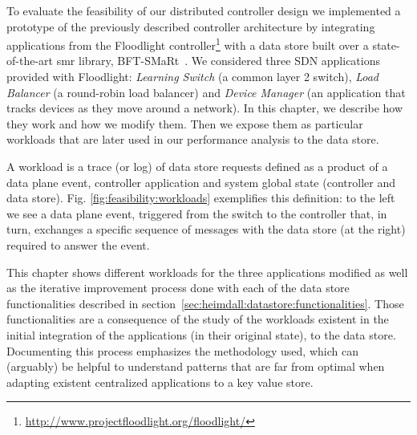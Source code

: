\label{sec:feasibility:apps}
\glsresetall


To evaluate the feasibility of our distributed controller design we implemented a prototype of the previously described controller architecture by integrating applications from the Floodlight controller\footnote{\url{http://www.projectfloodlight.org/floodlight/}} with a data store built over a state-of-the-art \gls{smr} library, BFT-SMaRt~\cite{smart-tr}.
We considered three SDN applications provided with Floodlight: \emph{Learning Switch}  (a common layer 2 switch), \emph{Load   Balancer} (a round-robin load balancer) and \emph{Device Manager} (an application that tracks devices as they move around a network).
In this chapter, we describe how they work and how we modify them.  Then we expose them as particular workloads that are later used in our performance analysis to the data store. 



A workload is a trace (or log) of data store requests  defined as a product of a data plane event, controller application and system global state (controller and data store).
Fig. \ref{fig:feasibility:workloads} exemplifies this definition: to the left we see a data plane event, triggered from the switch to the controller that, in turn, exchanges a specific sequence of messages with the data store (at the right) required to answer the event.

This chapter shows different workloads for the three applications modified as well as the iterative improvement process done with each of the data store functionalities described in section~\ref{sec:heimdall:datastore:functionalities}. 
Those functionalities are a consequence of the study of the workloads existent in the initial integration of the applications (in their original state), to the data store.
Documenting this process emphasizes the methodology  used, which can (arguably) be helpful to understand patterns that are far from optimal when adapting existent centralized applications to a key value store. 

